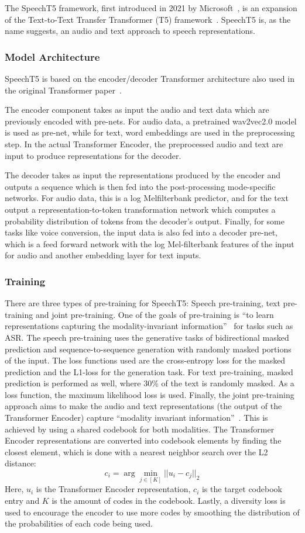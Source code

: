 The SpeechT5 framework, first introduced in 2021 by Microsoft~\cite{speecht5}, is an expansion of the Text-to-Text Transfer Transformer (T5) framework~\cite{t5}. SpeechT5 is, as the name suggests, an audio and text approach to speech representations. 
\subsubsection{Model Architecture}
SpeechT5 is based on the encoder/decoder Transformer architecture also used in the original Transformer paper~\cite{vaswani2023attention}.

The encoder component takes as input the audio and text data which are previously encoded with pre-nets. For audio data, a pretrained wav2vec2.0 model is used as pre-net, while for text, word embeddings are used in the preprocessing step. In the actual Transformer Encoder, the preprocessed audio and text are input to produce representations for the decoder.

The decoder takes as input the representations produced by the encoder and outputs a sequence which is then fed into the post-processing mode-specific networks. For audio data, this is a log Melfilterbank predictor, and for the text output a representation-to-token transformation network which computes a probability distribution of tokens from the decoder's output. Finally, for some tasks like voice conversion, the input data is also fed into a decoder pre-net, which is a feed forward network with the log Mel-filterbank features of the input for audio and another embedding layer for text inputs.
\subsubsection{Training}
There are three types of pre-training for SpeechT5: Speech pre-training, text pre-training and joint pre-training. One of the goals of pre-training is ``to learn representations
capturing the modality-invariant information''~\cite{speecht5} for tasks such as ASR. The speech pre-training uses the generative tasks of bidirectional masked prediction and sequence-to-sequence generation with randomly masked portions of the input. The loss functions used are the cross-entropy loss for the masked prediction and the L1-loss for the generation task. For text pre-training, masked prediction is performed as well, where 30\% of the text is randomly masked. As a loss function, the maximum likelihood loss is used. Finally, the joint pre-training approach aims to make the audio and text representations (the output of the Transformer Encoder) capture ``modality invariant information''~\cite{speecht5}. This is achieved by using a shared codebook for both modalities. The Transformer Encoder representations are converted into codebook elements by finding the closest element, which is done with a nearest neighbor search over the L2 distance: $$c_i = \arg\mathop{\min}\limits_{j\in [K]} ||u_i-c_j||_2$$ Here, $u_i$ is the Transformer Encoder representation, $c_i$ is the target codebook entry and $K$ is the amount of codes in the codebook. Lastly, a diversity loss is used to encourage the encoder to use more codes by smoothing the distribution of the probabilities of each code being used.

